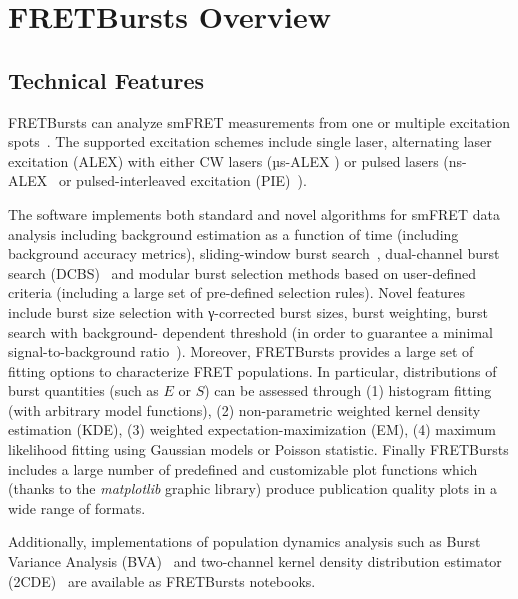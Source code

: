 \section{FRETBursts Overview}
\label{sec:overview}

\subsection{Technical Features}

FRETBursts can analyze smFRET measurements
from one or multiple excitation spots~\cite{Ingargiola_2013}. The supported
excitation schemes include single laser, alternating laser excitation (ALEX)
with either CW lasers (µs-ALEX \cite{Kapanidis_2005})
or pulsed lasers (ns-ALEX~\cite{Laurence_2005} or
pulsed-interleaved excitation (PIE)~\cite{M_ller_2005}).

The software implements both standard and novel algorithms for smFRET data analysis
including background estimation as a function of time (including background accuracy
metrics), sliding-window burst search~\cite{Eggeling_1998}, 
dual-channel burst search (DCBS)~\cite{Nir_2006} and
modular burst selection methods based on user-defined criteria
(including a large set of pre-defined selection rules). Novel features include burst size
selection with γ-corrected burst sizes, burst weighting, burst search with background-
dependent threshold (in order to guarantee a minimal signal-to-background 
ratio~\cite{Michalet_2012}).
Moreover, FRETBursts provides a large set of fitting options to characterize FRET populations. 
In particular, distributions of burst quantities (such as $E$ or $S$) can be assessed
through (1) histogram fitting (with arbitrary model functions),
(2) non-parametric weighted kernel density estimation (KDE), (3) weighted
expectation-maximization (EM), (4) maximum likelihood fitting using Gaussian models
or Poisson statistic. Finally FRETBursts includes a large number of
predefined and customizable plot functions which (thanks to the \textit{matplotlib}
graphic library) produce publication quality plots in a wide range of formats.

Additionally, implementations of population dynamics analysis such 
as Burst Variance Analysis (BVA)~\cite{Torella_2011} and two-channel 
kernel density distribution estimator (2CDE)~\cite{Tomov_2012} 
are available as FRETBursts notebooks.

